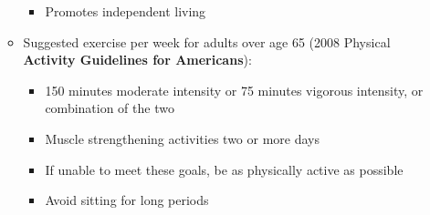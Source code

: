\documentclass[12pt]{article}
\begin{document}
\begin{itemize}
\begin{itemize}
\begin{itemize}
                                \item Promotes independent living
                            \end{itemize}
                        \item Suggested exercise per week for adults over age 65 (2008 Physical \textbf{Activity Guidelines for Americans}):
                            \begin{itemize}
                                \item 150 minutes moderate intensity or 75 minutes vigorous intensity, or combination of the two
                                \item Muscle strengthening activities two or more days
                                \item If unable to meet these goals, be as physically active as possible
                                \item Avoid sitting for long periods
                            \end{itemize}
                    \end{itemize}
            \end{itemize}
        
\end{document}
